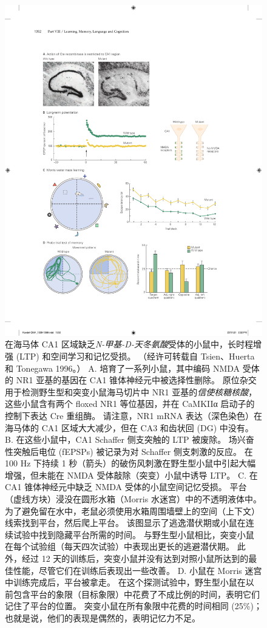 \begin{figure}[htbp]
	\centering
	\includegraphics[width=0.9\linewidth]{chap54/fig_54_7}
	\caption{在海马体 CA1 区域缺乏\textit{N-甲基-D-天冬氨酸}受体的小鼠中，长时程增强 (LTP) 和空间学习和记忆受损。 （经许可转载自 Tsien、Huerta 和 Tonegawa 1996。） A. 培育了一系列小鼠，其中编码 NMDA 受体的 NR1 亚基的基因在 CA1 锥体神经元中被选择性删除。 原位杂交用于检测野生型和突变小鼠海马切片中 NR1 亚基的\textit{信使核糖核酸}，这些小鼠含有两个 floxed NR1 等位基因，并在 CaMKIIα 启动子的控制下表达 Cre 重组酶。 请注意，NR1 mRNA 表达（深色染色）在海马体的 CA1 区域大大减少，但在 CA3 和齿状回 (DG) 中没有。 B. 在这些小鼠中，CA1 Schaffer 侧支突触的 LTP 被废除。 场兴奋性突触后电位 (fEPSPs) 被记录为对 Schaffer 侧支刺激的反应。 在 100 Hz 下持续 1 秒（箭头）的破伤风刺激在野生型小鼠中引起大幅增强，但未能在 NMDA 受体敲除（突变）小鼠中诱导 LTP。 C. 在 CA1 锥体神经元中缺乏 NMDA 受体的小鼠空间记忆受损。 平台（虚线方块）浸没在圆形水箱（Morris 水迷宫）中的不透明液体中。 为了避免留在水中，老鼠必须使用水箱周围墙壁上的空间（上下文）线索找到平台，然后爬上平台。 该图显示了逃逸潜伏期或小鼠在连续试验中找到隐藏平台所需的时间。 与野生型小鼠相比，突变小鼠在每个试验组（每天四次试验）中表现出更长的逃避潜伏期。 此外，经过 12 天的训练后，突变小鼠并没有达到对照小鼠所达到的最佳性能，尽管它们在训练后表现出一些改善。 D. 小鼠在 Morris 迷宫中训练完成后，平台被拿走。 在这个探测试验中，野生型小鼠在以前包含平台的象限（目标象限）中花费了不成比例的时间，表明它们记住了平台的位置。 突变小鼠在所有象限中花费的时间相同 (25\%)； 也就是说，他们的表现是偶然的，表明记忆力不足。}
	\label{fig:54_7}
\end{figure}


